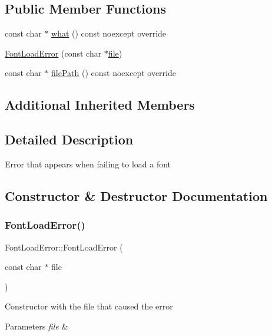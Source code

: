 \subsection*{Public Member Functions}
\begin{DoxyCompactItemize}
\item 
const char $\ast$ \hyperlink{classFontLoadError_a523f16150eb19d25ed5692512e6952f5}{what} () const noexcept override
\item 
\hyperlink{classFontLoadError_a2d9e45a31deb3f088ce7d8f26381723d}{Font\+Load\+Error} (const char $\ast$\hyperlink{classFileError_a0ea1cc225bf7f8fa47aa0cfa0c2ba685}{file})
\item 
const char $\ast$ \hyperlink{classFontLoadError_aa1b4295ca60b389717e40fcbf723fb83}{file\+Path} () const noexcept override
\end{DoxyCompactItemize}
\subsection*{Additional Inherited Members}


\subsection{Detailed Description}
Error that appears when failing to load a font 

\subsection{Constructor \& Destructor Documentation}
\mbox{\label{classFontLoadError_a2d9e45a31deb3f088ce7d8f26381723d}} 
\subsubsection{\texorpdfstring{Font\+Load\+Error()}{FontLoadError()}}
{\footnotesize\ttfamily Font\+Load\+Error\+::\+Font\+Load\+Error (\begin{DoxyParamCaption}\item[{const char $\ast$}]{file }\end{DoxyParamCaption})}

Constructor with the file that caused the error 
\begin{DoxyParams}{Parameters}
{\em file} & \\
\hline
\end{DoxyParams}


